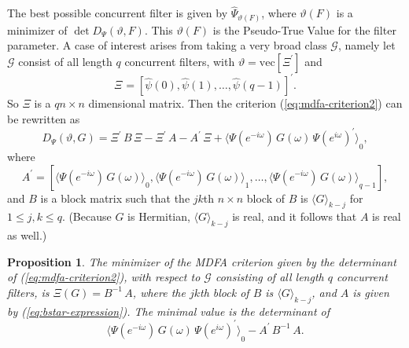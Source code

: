 \documentclass[a4paper]{book}
\newtheorem{Proposition}{Proposition}
\begin{document}
The  best possible concurrent filter is  given by
 $\widehat{\Psi}_{\vartheta (F)}$,
  where $\vartheta (F)$ is a minimizer of
  $\det D_{\Psi} (\vartheta, F)$.  This $\vartheta (F)$ is the
 Pseudo-True Value  for the filter parameter.
A   case of interest arises from taking a very broad class $\mathcal{G}$, namely
  let $\mathcal{G}$ consist of all length $q$ concurrent filters, with 
$\vartheta =  \mbox{vec} [\Xi^{\prime}]$ and 
\begin{equation}
\label{eq:conc.filter}
  \Xi^{}  =  {\left[  \widehat{\psi} (0), \widehat{\psi} (1), \ldots, 
  \widehat{\psi} (q-1) \right] }^{\prime}.
\end{equation}
 So $\Xi$ is  a   $ q n \times n$ dimensional matrix.
 Then the criterion (\ref{eq:mdfa-criterion2}) can be rewritten as
\begin{equation}
\label{eq:mdfa-crit.linear}
 D_{\Psi} (\vartheta, G)  = \Xi^{\prime} \, B \, \Xi -
   \Xi^{\prime} \, A - 
   A^{\prime} \, \Xi + { \langle \Psi (e^{-i \omega}) \, G (\omega) \, { \Psi (e^{i \omega}) }^{\prime} \rangle }_0,
\end{equation}
 where 
\begin{equation}
 \label{eq:bstar-expression}
  A^{\prime}  = \left[ { \langle \Psi (e^{-i \omega}) \, G (\omega) 
  \rangle }_{0}, { \langle \Psi (e^{-i \omega}) \, G (\omega) \rangle }_{1},
  \ldots, { \langle \Psi (e^{-i \omega}) \, G (\omega) \rangle }_{q-1} \right],
\end{equation}
  and $B$ is a block matrix such that  the $jk$th $n \times n$ block of $B$  is 
  ${ \langle G \rangle }_{k-j}$ for $1 \leq j,k \leq q$.  (Because $G$ is Hermitian,
 ${ \langle G \rangle }_{k-j}$ is real, and it follows that $A$ is real as well.)



\begin{Proposition}
\label{prop:mdfa.quadsoln2}
 The minimizer of the   MDFA criterion given by the determinant of (\ref{eq:mdfa-criterion2}),
  with respect to $\mathcal{G}$ consisting of all length $q$ concurrent filters,  is
  $ \Xi (G) = B^{-1} \, A$,
 where the $jk$th  block of $B$   is    ${ \langle G \rangle }_{k-j}$,
 and $A$ is given by (\ref{eq:bstar-expression}).
 The minimal value is the determinant of
\begin{equation}
\label{eq:opt.val.mdfa2}
{ \langle \Psi (e^{-i \omega}) \, G (\omega) \, { \Psi (e^{i \omega}) }^{\prime} \rangle }_0 - A^{\prime} \, B^{-1} \, A.
\end{equation}
\end{Proposition}
\end{document}
